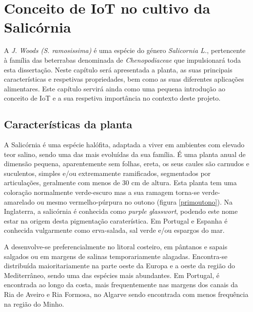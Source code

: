 
\chapter{Conceito de IoT no cultivo da Salicórnia}

 A \sr \space \textit{J. Woods (S. ramosissima)}\cite{JoaoSilva} é uma espécie do género \textit{Salicornia L.}, pertencente à família das beterrabas denominada de \textit{Chenopodiaceae}\cite{chenopodiaceae} que impulsionará toda esta dissertação.  Neste capítulo será apresentada a planta, as suas principais características e respetivas propriedades, bem como as suas diferentes aplicações alimentares. Este capítulo servirá ainda como uma pequena introdução ao conceito de \ac{IoT} e a sua respetiva importância no contexto deste projeto.


\section{Características da planta}


A Salicórnia é uma espécie halófita, adaptada a viver em ambientes com elevado teor salino\cite{ferri}, sendo uma das mais evoluídas da sua família. É uma planta anual de dimensão pequena, aparentemente sem folhas, ereta, os seus caules são carnudos e suculentos, simples e/ou extremamente ramificados, segmentados por articulações\cite{Silva2000}, geralmente com menos de 30 cm de altura\cite{overviewsal}. Esta planta tem uma coloração normalmente verde-escuro mas a sua ramagem torna-se  verde-amarelado ou mesmo vermelho-púrpura no outono\cite{Silva2000} (figura \ref{primoutono}). Na Inglaterra, a salicórnia é conhecida como \textit{purple glasswort}, podendo este nome estar na origem desta pigmentação caraterística\cite{Davy2001}. Em Portugal e Espanha é conhecida vulgarmente como erva-salada, sal verde e/ou espargos do mar\cite{RaquelPinto}. 




A \sr \space desenvolve-se preferencialmente no litoral costeiro, em pântanos e sapais salgados ou em margens de salinas temporariamente alagadas. Encontra-se distribuída maioritariamente na parte oeste da Europa e a oeste da região do Mediterrâneo, sendo uma das espécies mais abundantes\cite{Figueroa1987}. Em Portugal, é encontrada ao longo da costa, mais frequentemente nas margens dos canais da Ria de Aveiro e Ria Formosa, no Algarve\cite{RaquelPinto} sendo encontrada com menos frequência na região do Minho\cite{Silva2000}. 


